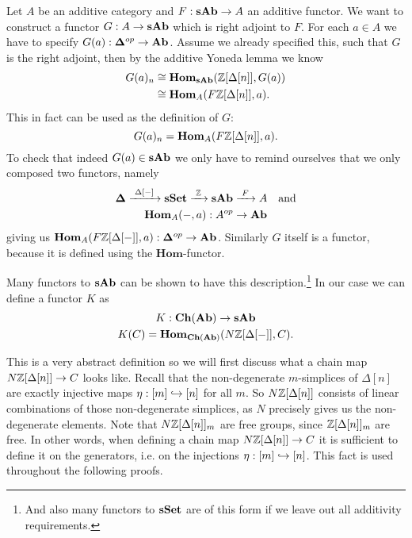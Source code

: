 Let $A$ be an additive category and $F: \mathbf{sAb} \to A$ an additive functor. We want to construct a functor $G: A \to \mathbf{sAb}$ which is right adjoint to $F$. For each $a \in A$ we have to specify $G(a): \mathbf{\Delta}^{op} \to \mathbf{Ab}$. Assume we already specified this, such that $G$ is the right adjoint, then by the additive Yoneda lemma we know
\begin{align*}
	G(a)_n &\cong \mathbf{Hom}_{\mathbf{sAb}}(\mathbb{Z}[\Delta[n]], G(a)) \\
		&\cong \mathbf{Hom}_{A}(F\mathbb{Z}[\Delta[n]], a).
\end{align*}
This in fact can be used as the definition of $G$:
$$ G(a)_n = \mathbf{Hom}_{A}(F\mathbb{Z}[\Delta[n]], a). $$
To check that indeed $G(a) \in \mathbf{sAb}$ we only have to remind ourselves that we only composed two functors, namely
\begin{gather*}
	\mathbf{\Delta} \xrightarrow{\,\,{\Delta[-]}\,\,} \mathbf{sSet} \xrightarrow{\,\,{\mathbb{Z}}\,\,} \mathbf{sAb} \xrightarrow{\,\,{F}\,\,} A \quad\text{and} \\
	\mathbf{Hom}_{A}(-, a): A^{op} \to \mathbf{Ab}
\end{gather*}
giving us $\mathbf{Hom}_{A}(F\mathbb{Z}[\Delta[-]], a): \mathbf{\Delta}^{op} \to \mathbf{Ab}$. Similarly $G$ itself is a functor, because it is defined using the $\mathbf{Hom}$-functor.

Many functors to $\mathbf{sAb}$ can be shown to have this description.\footnote{And also many functors to $\mathbf{sSet}$ are of this form if we leave out all additivity requirements.} In our case we can define a functor $K$ as
\begin{gather*}
	K: \mathbf{Ch}(\mathbf{Ab}) \to \mathbf{sAb} \\
	K(C) = \mathbf{Hom}_{\mathbf{Ch}(\mathbf{Ab})}(N\mathbb{Z}[\Delta[-]], C).
\end{gather*}

This is a very abstract definition so we will first discuss what a chain map $N\mathbb{Z}[\Delta[n]] \to C$ looks like. Recall that the non-degenerate $m$-simplices of $\Delta[n]$ are exactly injective maps $\eta: [m] \hookrightarrow [n]$ for all $m$. So $N\mathbb{Z}[\Delta[n]]$ consists of linear combinations of those non-degenerate simplices, as $N$ precisely gives us the non-degenerate elements. Note that $N\mathbb{Z}[\Delta[n]]_m$ are free groups, since $\mathbb{Z}[\Delta[n]]_m$ are free. In other words, when defining a chain map $N\mathbb{Z}[\Delta[n]] \to C$ it is sufficient to define it on the generators, i.e. on the injections $\eta: [m] \hookrightarrow [n]$. This fact is used throughout the following proofs.

